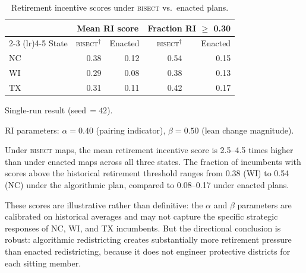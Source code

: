 \begin{table}[ht]
\centering
\begin{threeparttable}
\caption{Retirement incentive scores under \textsc{bisect} vs.\ enacted plans.}
\label{tab:retirement}
\begin{tabular}{l r r r r}
\toprule
 & \multicolumn{2}{c}{Mean RI score} & \multicolumn{2}{c}{Fraction RI $\geq$ 0.30} \\
\cmidrule(lr){2-3} \cmidrule(lr){4-5}
State & \textsc{bisect}$^\dagger$ & Enacted & \textsc{bisect}$^\dagger$ & Enacted \\
\midrule
NC & 0.38 & 0.12 & 0.54 & 0.15 \\
WI & 0.29 & 0.08 & 0.38 & 0.13 \\
TX & 0.31 & 0.11 & 0.42 & 0.17 \\
\bottomrule
\end{tabular}
\begin{tablenotes}
\small
\item[$\dagger$] Single-run result (seed\,$=42$).
\item RI parameters: $\alpha = 0.40$ (pairing indicator), $\beta = 0.50$ (lean change magnitude).
\end{tablenotes}
\end{threeparttable}
\end{table}

Under \textsc{bisect} maps, the mean retirement incentive score is 2.5--4.5 times
higher than under enacted maps across all three states. The fraction of incumbents
with scores above the historical retirement threshold ranges from 0.38 (WI) to 0.54
(NC) under the algorithmic plan, compared to 0.08--0.17 under enacted plans.

These scores are illustrative rather than definitive: the $\alpha$ and $\beta$
parameters are calibrated on historical averages and may not capture the specific
strategic responses of NC, WI, and TX incumbents. But the directional conclusion is
robust: algorithmic redistricting creates substantially more retirement pressure than
enacted redistricting, because it does not engineer protective districts for each
sitting member.
